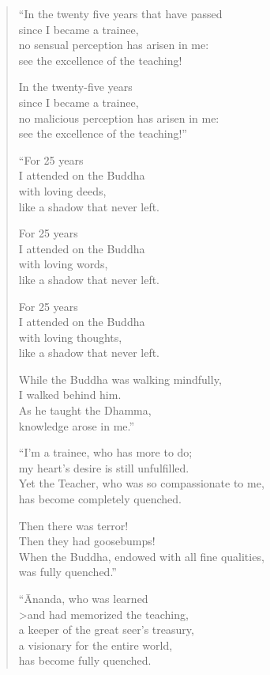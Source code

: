 \documentclass[12pt,openany]{book}%
\begin{document}
\begin{verse}
“In the twenty five years that have passed \\
since I became a trainee, \\
no sensual perception has arisen in me: \\
see the excellence of the teaching! 

In the twenty-five years \\
since I became a trainee, \\
no malicious perception has arisen in me: \\
see the excellence of the teaching!” 

“For 25 years \\
I attended on the Buddha \\
with loving deeds, \\
like a shadow that never left. 

For 25 years \\
I attended on the Buddha \\
with loving words, \\
like a shadow that never left. 

For 25 years \\
I attended on the Buddha \\
with loving thoughts, \\
like a shadow that never left. 

While the Buddha was walking mindfully, \\
I walked behind him. \\
As he taught the Dhamma, \\
knowledge arose in me.” 

“I’m a trainee, who has more to do; \\
my heart’s desire is still unfulfilled. \\
Yet the Teacher, who was so compassionate to me, \\
has become completely quenched. 

Then there was terror! \\
Then they had goosebumps! \\
When the Buddha, endowed with all fine qualities, \\
was fully quenched.” 

“Ānanda, who was learned \\>and had memorized the teaching, \\
a keeper of the great seer’s treasury, \\
a visionary for the entire world, \\
has become fully quenched. 


\end{verse}
\end{document}
